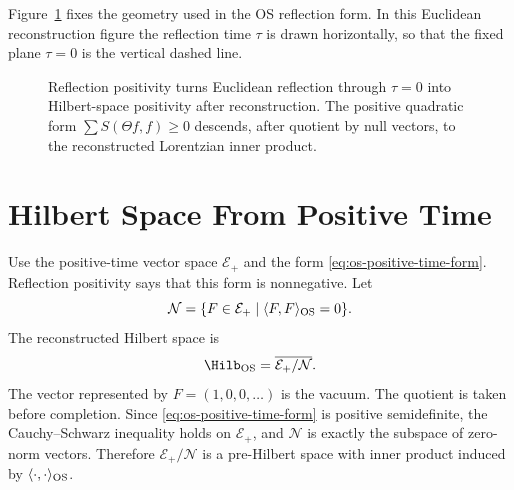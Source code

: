 Figure~\ref{fig:os-reflection-positivity} fixes the geometry used in the OS
reflection form.  In this Euclidean reconstruction figure the reflection time
\(\tau\) is drawn horizontally, so that the fixed plane \(\tau=0\) is the
vertical dashed line.

\begin{figure}[H]
  \centering
  \caption{Reflection positivity turns Euclidean reflection through
  \(\tau=0\) into Hilbert-space positivity after reconstruction.  The
  positive quadratic form \(\sum S(\Theta f,f)\ge0\) descends, after quotient
  by null vectors, to the reconstructed Lorentzian inner product.}
  \label{fig:os-reflection-positivity}
\end{figure}

\section{Hilbert Space From Positive Time}

Use the positive-time vector space \(\mathcal E_+\) and the form
\eqref{eq:os-positive-time-form}.  Reflection positivity says that this form
is nonnegative.  Let
\[
  \mathcal N=\{F\in\mathcal E_+\mid \langle F,F\rangle_{\rm OS}=0\}.
\]
The reconstructed Hilbert space is
\[
  \Hilb_{\rm OS}
  =
  \overline{\mathcal E_+/\mathcal N}.
\]
The vector represented by \(F=(1,0,0,\ldots)\) is the vacuum.
The quotient is taken before completion.  Since
\eqref{eq:os-positive-time-form} is positive semidefinite, the
Cauchy--Schwarz inequality holds on \(\mathcal E_+\), and
\(\mathcal N\) is exactly the subspace of zero-norm vectors.  Therefore
\(\mathcal E_+/\mathcal N\) is a pre-Hilbert space with inner product induced
by \(\langle\cdot,\cdot\rangle_{\rm OS}\).

